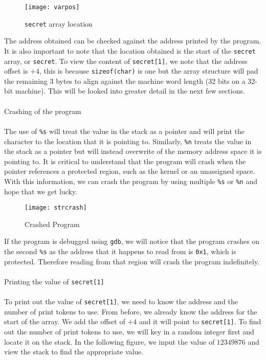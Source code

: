 \documentclass[a4paper,12pt]{article}
\newcommand*\circled[1]{\tikz[baseline=(char.base)]{
		\node[shape=circle,draw,inner sep=2pt] (char) {#1};}}
\begin{document}
\begin{figure}[H]
	\centering
	\texttt{[image: varpos]}
	\caption{\texttt{secret} array location}
	\label{fig:varpos}
\end{figure}
\noindent The address obtained can be checked against the address printed by the program. It is also important to note that the location obtained is the start of the \texttt{secret} array, or \texttt{secret}. To view the content of \texttt{secret[1]}, we note that the address offset is $+4$, this is because \texttt{sizeof(char)} is one but the array structure will pad the remaining 3 bytes to align against the machine word length (32 bits on a 32-bit machine). This will be looked into greater detail in the next few sections.\\\\\circled{1} Crashing of the program\\\\The use of \texttt{\%s} will treat the value in the stack as a pointer and will print the character to the location that it is pointing to. Similarly, \texttt{\%n} treats the value in the stack as a pointer but will instead overwrite of the memory address space it is pointing to. It is critical to understand that the program will crash when the pointer references a protected region, such as the kernel or an unassigned space. With this information, we can crash the program by using multiple \texttt{\%s} or \texttt{\%n} and hope that we get lucky.
\begin{figure}[H]
	\centering
	\texttt{[image: strcrash]}
	\caption{Crashed Program}
	\label{fig:strcrash}
\end{figure}
\noindent If the program is debugged using \texttt{gdb}, we will notice that the program crashes on the second \texttt{\%s} as the address that it happens to read from is \texttt{0x1}, which is protected. Therefore reading from that region will crash the program indefinitely.\\\\\circled{2} Printing the value of \texttt{secret[1]}\\\\To print out the value of \texttt{secret[1]}, we need to know the address and the number of print tokens to use. From before, we already know the address for the start of the array. We add the offset of $+4$ and it will point to \texttt{secret[1]}. To find out the number of print tokens to use, we will key in a random integer first and locate it on the stack. In the following figure, we input the value of $12349876$ and view the stack to find the appropriate value.
\end{document}
